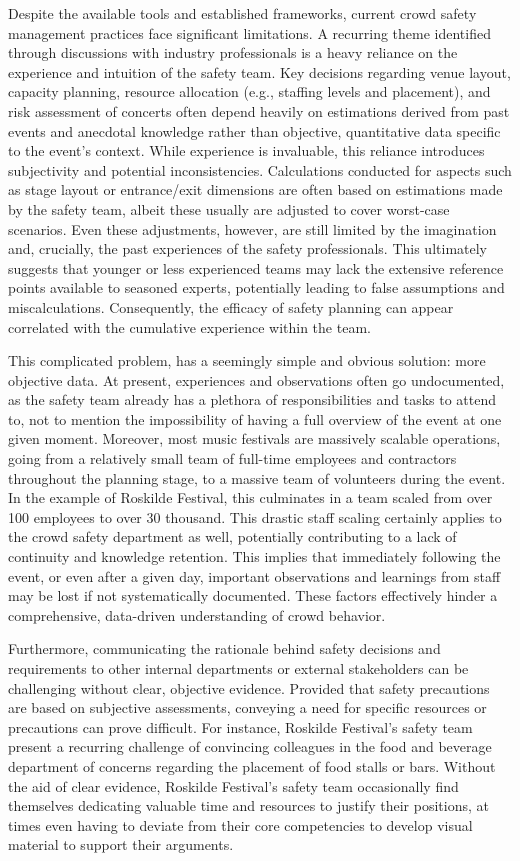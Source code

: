 Despite the available tools and established frameworks, current crowd safety management practices face significant limitations. A recurring theme identified through discussions with industry professionals is a heavy reliance on the experience and intuition of the safety team. Key decisions regarding venue layout, capacity planning, resource allocation (e.g., staffing levels and placement), and risk assessment of concerts often depend heavily on estimations derived from past events and anecdotal knowledge rather than objective, quantitative data specific to the event's context. While experience is invaluable, this reliance introduces subjectivity and potential inconsistencies. Calculations conducted for aspects such as stage layout or entrance/exit dimensions are often based on estimations made by the safety team, albeit these usually are adjusted to cover worst-case scenarios. Even these adjustments, however, are still limited by the imagination and, crucially, the past experiences of the safety professionals. This ultimately suggests that younger or less experienced teams may lack the extensive reference points available to seasoned experts, potentially leading to false assumptions and miscalculations. Consequently, the efficacy of safety planning can appear correlated with the cumulative experience within the team.

This complicated problem, has a seemingly simple and obvious solution: more objective data. At present, experiences and observations often go undocumented, as the safety team already has a plethora of responsibilities and tasks to attend to, not to mention the impossibility of having a full overview of the event at one given moment. Moreover, most music festivals are massively scalable operations, going from a relatively small team of full-time employees and contractors throughout the planning stage, to a massive team of volunteers during the event. In the example of Roskilde Festival, this culminates in a team scaled from over 100 employees to over 30 thousand. This drastic staff scaling certainly applies to the crowd safety department as well, potentially contributing to a lack of continuity and knowledge retention. This implies that immediately following the event, or even after a given day, important observations and learnings from staff may be lost if not systematically documented. These factors effectively hinder a comprehensive, data-driven understanding of crowd behavior.

Furthermore, communicating the rationale behind safety decisions and requirements to other internal departments or external stakeholders can be challenging without clear, objective evidence. Provided that safety precautions are based on subjective assessments, conveying a need for specific resources or precautions can prove difficult. For instance, Roskilde Festival's safety team present a recurring challenge of convincing colleagues in the food and beverage department of concerns regarding the placement of food stalls or bars. Without the aid of clear evidence, Roskilde Festival's safety team occasionally find themselves dedicating valuable time and resources to justify their positions, at times even having to deviate from their core competencies to develop visual material to support their arguments.

